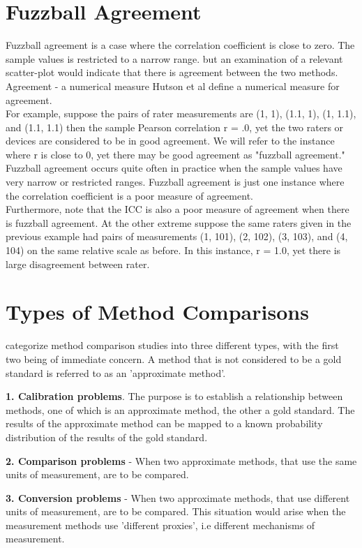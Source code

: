 \documentclass[Chap1bmain.tex]{subfiles}
\begin{document}
\section{Fuzzball Agreement}
Fuzzball agreement is a case where the correlation coefficient is close to zero. The sample values is restricted to a narrow range. but an examination of a relevant scatter-plot would indicate that
there is agreement between the two methods.
\\
Agreement - a numerical measure Hutson et al define a numerical measure for agreement.
\\
For example, suppose the pairs of rater measurements are (1, 1), (1.1, 1), (1, 1.1), and (1.1, 1.1) then the sample Pearson correlation r = .0, yet the two raters or devices are considered to be in good agreement. We will refer to the instance where r is close to 0, yet there may be good agreement as "fuzzball agreement." \\Fuzzball agreement occurs quite often in practice when the sample values have very narrow or restricted ranges. Fuzzball agreement is just one instance where the correlation coefficient is a poor measure of agreement. \\Furthermore, note that the ICC is also a poor measure of agreement when there is fuzzball agreement. At the other extreme suppose the same raters given in the previous example had pairs of measurements (1, 101), (2, 102), (3, 103), and (4, 104) on the same relative scale as before. In this instance, r = 1.0, yet there is large disagreement between rater.

\section{Types of Method Comparisons} \citet{Lewis} categorize
method comparison studies into three different types, with the
first two being of immediate concern. A method that is not considered to be a gold standard is referred
to as an 'approximate method'.

\textbf{1. Calibration problems}. The purpose is to establish a
relationship between methods, one of which is an approximate
method, the other a gold standard. The results of the approximate
method can be mapped to a known probability distribution of the
results of the gold standard.

\smallskip
\textbf{2. Comparison problems} - When two approximate methods,
that use the same units of measurement, are to be compared.

\smallskip
\textbf{3. Conversion problems} -  When two approximate methods,
that use different units of measurement, are to be compared. This
situation would arise when the measurement methods use 'different
proxies', i.e different mechanisms of measurement.
\end{document}
